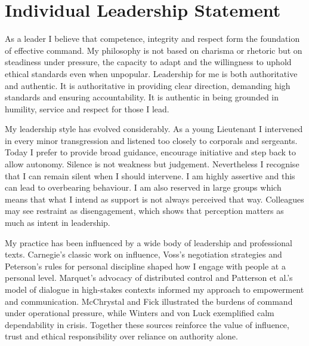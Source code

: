 \chapter{Individual Leadership Statement}

As a leader I believe that competence, integrity and respect form the foundation of effective command. My philosophy is not based on charisma or rhetoric but on steadiness under pressure, the capacity to adapt and the willingness to uphold ethical standards even when unpopular. Leadership for me is both authoritative and authentic. It is authoritative in providing clear direction, demanding high standards and ensuring accountability. It is authentic in being grounded in humility, service and respect for those I lead.  

My leadership style has evolved considerably. As a young Lieutenant I intervened in every minor transgression and listened too closely to corporals and sergeants. Today I prefer to provide broad guidance, encourage initiative and step back to allow autonomy. Silence is not weakness but judgement. Nevertheless I recognise that I can remain silent when I should intervene. I am highly assertive and this can lead to overbearing behaviour. I am also reserved in large groups which means that what I intend as support is not always perceived that way. Colleagues may see restraint as disengagement, which shows that perception matters as much as intent in leadership.  

My practice has been influenced by a wide body of leadership and professional texts. Carnegie’s classic work on influence, Voss’s negotiation strategies and Peterson’s rules for personal discipline shaped how I engage with people at a personal level. Marquet’s advocacy of distributed control and Patterson et al.’s model of dialogue in high-stakes contexts informed my approach to empowerment and communication. McChrystal and Fick illustrated the burdens of command under operational pressure, while Winters and von Luck exemplified calm dependability in crisis. Together these sources reinforce the value of influence, trust and ethical responsibility over reliance on authority alone.  

